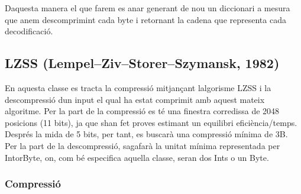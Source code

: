 D\textquotesingle{}aquesta manera el que farem es anar generant de nou un diccionari a mesura que anem descomprimint cada byte i retornant la cadena que representa cada decodificació.

\subsection*{L\+Z\+SS (Lempel–\+Ziv–\+Storer–\+Szymansk, 1982)}

En aquesta classe es tracta la compressió mitjançant l\textquotesingle{}algorisme L\+Z\+SS i la descompressió d\textquotesingle{}un input el qual ha estat comprimit amb aquest mateix algoritme. Per la part de la compressió es té una finestra corredissa de 2048 posicions (11 bits), ja que s\textquotesingle{}han fet proves estimant un equilibri eficiència/temps. Després la mida de 5 bits, per tant, es buscarà una compressió mínima de 3B. Per la part de la descompressió, s\textquotesingle{}agafarà la unitat mínima representada per Intor\+Byte, on, com bé especifica aquella classe, seran dos Int\textquotesingle{}s o un Byte.

\subsubsection*{Compressió}


